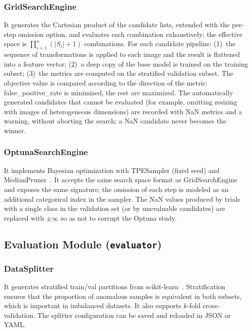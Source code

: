 \documentclass[conference]{IEEEtran}
\begin{document}
\subsubsection{GridSearchEngine}

It generates the Cartesian product of the candidate lists, extended with the
per-step omission option, and evaluates each combination exhaustively; the
effective space is $\prod_{i=1}^{n} (|S_i|+1)$ combinations. For each candidate
pipeline: (1)~the sequence of transformations is applied to each image and the
result is flattened into a feature vector; (2)~a deep copy of the base model is
trained on the training subset; (3)~the metrics are computed on the stratified
validation subset. The objective value is compared according to the direction
of the metric: false\_positive\_rate is minimized, the rest are maximized. The
automatically generated candidates that cannot be evaluated (for example,
omitting resizing with images of heterogeneous dimensions) are recorded with
NaN metrics and a warning, without aborting the search; a NaN candidate never
becomes the winner.

\subsubsection{OptunaSearchEngine}

It implements Bayesian optimization with TPESampler (fixed seed) and
MedianPruner~\cite{akiba2019optuna}. It accepts the same search space format as
GridSearchEngine and exposes the same signature; the omission of each step is
modeled as an additional categorical index in the sampler. The NaN values
produced by trials with a single class in the validation set (or by
unevaluable candidates) are replaced with $\pm\infty$ so as not to corrupt the
Optuna study.

\subsection{Evaluation Module (\texttt{evaluator})}

\subsubsection{DataSplitter}

It generates stratified train/val partitions from
scikit-learn~\cite{pedregosa2011sklearn}. Stratification ensures that the
proportion of anomalous samples is equivalent in both subsets, which is
important in imbalanced datasets. It also supports $k$-fold cross-validation.
The splitter configuration can be saved and reloaded in JSON or YAML.
\end{document}
